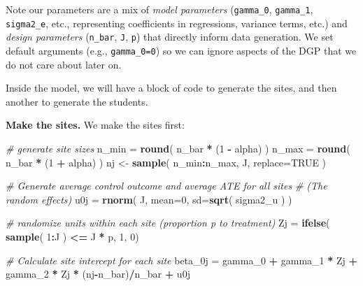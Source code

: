 \documentclass[
]{book}
\newenvironment{Shaded}{\begin{snugshade}}{\end{snugshade}}
\newcommand{\AttributeTok}[1]{\textcolor[rgb]{0.13,0.29,0.53}{#1}}
\newcommand{\CommentTok}[1]{\textcolor[rgb]{0.56,0.35,0.01}{\textit{#1}}}
\newcommand{\ConstantTok}[1]{\textcolor[rgb]{0.56,0.35,0.01}{#1}}
\newcommand{\DecValTok}[1]{\textcolor[rgb]{0.00,0.00,0.81}{#1}}
\newcommand{\FunctionTok}[1]{\textcolor[rgb]{0.13,0.29,0.53}{\textbf{#1}}}
\newcommand{\NormalTok}[1]{#1}
\newcommand{\OtherTok}[1]{\textcolor[rgb]{0.56,0.35,0.01}{#1}}
\newcommand{\SpecialCharTok}[1]{\textcolor[rgb]{0.81,0.36,0.00}{\textbf{#1}}}
\begin{document}
Note our parameters are a mix of \emph{model parameters} (\texttt{gamma\_0}, \texttt{gamma\_1}, \texttt{sigma2\_e}, etc., representing coefficients in regressions, variance terms, etc.) and \emph{design parameters} (\texttt{n\_bar}, \texttt{J}, \texttt{p}) that directly inform data generation.
We set default arguments (e.g., \texttt{gamma\_0=0}) so we can ignore aspects of the DGP that we do not care about later on.

Inside the model, we will have a block of code to generate the sites, and then another to generate the students.

\textbf{Make the sites.}
We make the sites first:

\begin{Shaded}
\begin{Highlighting}[]
\CommentTok{\# generate site sizes }
\NormalTok{n\_min }\OtherTok{=} \FunctionTok{round}\NormalTok{( n\_bar }\SpecialCharTok{*}\NormalTok{ (}\DecValTok{1} \SpecialCharTok{{-}}\NormalTok{ alpha) )}
\NormalTok{n\_max }\OtherTok{=} \FunctionTok{round}\NormalTok{( n\_bar }\SpecialCharTok{*}\NormalTok{ (}\DecValTok{1} \SpecialCharTok{+}\NormalTok{ alpha) )}
\NormalTok{nj }\OtherTok{\textless{}{-}} \FunctionTok{sample}\NormalTok{( n\_min}\SpecialCharTok{:}\NormalTok{n\_max, J, }\AttributeTok{replace=}\ConstantTok{TRUE}\NormalTok{ )}

\CommentTok{\# Generate average control outcome and average ATE for all sites}
\CommentTok{\# (The random effects)}
\NormalTok{u0j }\OtherTok{=} \FunctionTok{rnorm}\NormalTok{( J, }\AttributeTok{mean=}\DecValTok{0}\NormalTok{, }\AttributeTok{sd=}\FunctionTok{sqrt}\NormalTok{( sigma2\_u ) )}

\CommentTok{\# randomize units within each site (proportion p to treatment)}
\NormalTok{Zj }\OtherTok{=} \FunctionTok{ifelse}\NormalTok{( }\FunctionTok{sample}\NormalTok{( }\DecValTok{1}\SpecialCharTok{:}\NormalTok{J ) }\SpecialCharTok{\textless{}=}\NormalTok{ J }\SpecialCharTok{*}\NormalTok{ p, }\DecValTok{1}\NormalTok{, }\DecValTok{0}\NormalTok{)}

\CommentTok{\# Calculate site intercept for each site}
\NormalTok{beta\_0j }\OtherTok{=}\NormalTok{ gamma\_0 }\SpecialCharTok{+}\NormalTok{ gamma\_1 }\SpecialCharTok{*}\NormalTok{ Zj }\SpecialCharTok{+}\NormalTok{ gamma\_2 }\SpecialCharTok{*}\NormalTok{ Zj }\SpecialCharTok{*}\NormalTok{ (nj}\SpecialCharTok{{-}}\NormalTok{n\_bar)}\SpecialCharTok{/}\NormalTok{n\_bar }\SpecialCharTok{+}\NormalTok{ u0j}
\end{Highlighting}
\end{Shaded}
\end{document}
